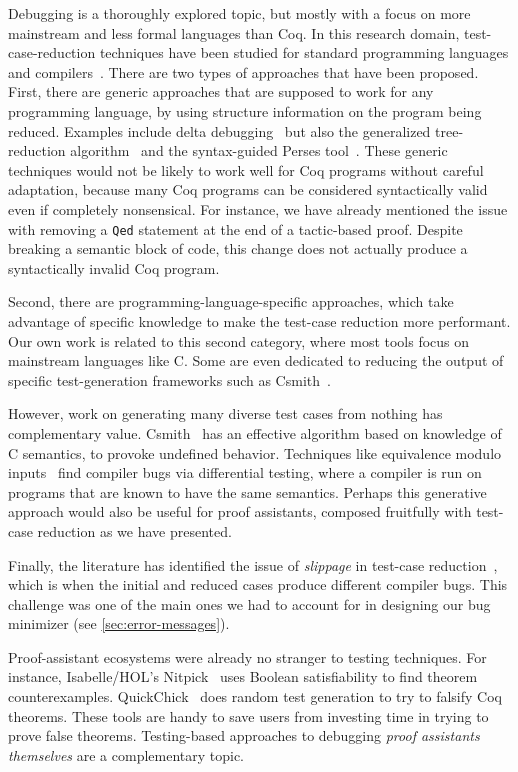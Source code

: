 \documentclass[a4paper,USenglish,cleveref,autoref,thm-restate,pdfa]{lipics-v2021}
\begin{document}
Debugging is a thoroughly explored topic, but mostly with a focus on more mainstream and less formal languages than Coq.
In this research domain, test-case-reduction techniques have been studied for standard programming languages and compilers~\cite{chen_survey_compiler_testing}. There are two types of approaches that have been proposed. First, there are generic approaches that are supposed to work for any programming language, by using structure information on the program being reduced. Examples include delta debugging~\cite{Zeller2002} but also the generalized tree-reduction algorithm~\cite{herfert2017automatically} and the syntax-guided Perses tool~\cite{herfert2017automatically}. These generic techniques would not be likely to work well for Coq programs without careful adaptation, because many Coq programs can be considered syntactically valid even if completely nonsensical. For instance, we have already mentioned the issue with removing a \texttt{Qed} statement at the end of a tactic-based proof. Despite breaking a semantic block of code, this change does not actually produce a syntactically invalid Coq program.

Second, there are programming-language-specific approaches, which take advantage of specific knowledge to make the test-case reduction more performant. Our own work is related to this second category, where most tools focus on mainstream languages like C. Some are even dedicated to reducing the output of specific test-generation frameworks such as Csmith~\cite{regehr2012test}.

However, work on generating many diverse test cases from nothing has complementary value.
Csmith~\cite{yang2011finding} has an effective algorithm based on knowledge of C semantics, to provoke undefined behavior.
Techniques like equivalence modulo inputs~\cite{emi} find compiler bugs via differential testing, where a compiler is run on programs that are known to have the same semantics.
Perhaps this generative approach would also be useful for proof assistants, composed fruitfully with test-case reduction as we have presented.

Finally, the literature has identified the issue of \emph{slippage} in test-case reduction~\cite{chen2013taming,holmes2016mitigating}, which is when the initial and reduced cases produce different compiler bugs. This challenge was one of the main ones we had to account for in designing our bug minimizer (see \autoref{sec:error-messages}).

Proof-assistant ecosystems were already no stranger to testing techniques.
For instance, Isabelle/HOL's Nitpick~\cite{Nitpick} uses Boolean satisfiability to find theorem counterexamples.
QuickChick~\cite{quickchick} does random test generation to try to falsify Coq theorems.
These tools are handy to save users from investing time in trying to prove false theorems.
Testing-based approaches to debugging \emph{proof assistants themselves} are a complementary topic.
\end{document}
